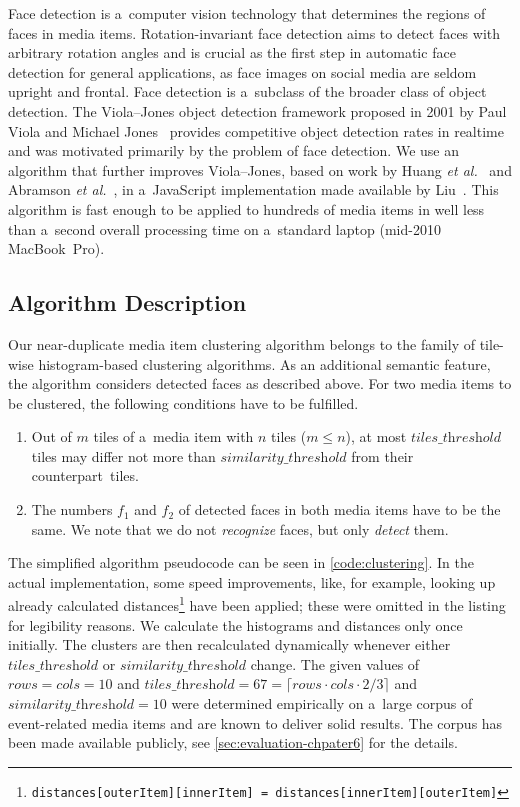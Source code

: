 Face detection is a~computer vision technology
that determines the regions of faces in media items.
Rotation-invariant face detection aims to detect faces with arbitrary
rotation angles and is crucial as the first step in automatic face detection
for general applications, as face images on social media are seldom upright and frontal.
Face detection is a~subclass of the broader class of object detection.
The Viola--Jones object detection framework proposed in 2001
by Paul Viola and Michael
Jones~\cite{viola2001objectdetection,viola2004robust}
provides competitive object detection rates in realtime
and was motivated primarily by the problem of face detection.
We use an algorithm that further improves Viola--Jones,
based on work by Huang \emph{et al.}~\cite{huang2007facedetection}
and Abramson \emph{et al.}~\cite{abramson2007yef},
in a~JavaScript implementation made available by Liu~\cite{liu2012facedetection}.
This algorithm is fast enough to be applied to hundreds of media items
in well less than a~second overall processing time on a~standard laptop
(mid-2010 MacBook~Pro).

\subsection{Algorithm Description}

Our near-duplicate media item clustering algorithm belongs to the family of
tile-wise histogram-based clustering algorithms.
As an additional semantic feature, the algorithm considers detected faces
as described above.
For two media items to be clustered,
the following conditions have to be fulfilled.

\begin{enumerate}
  \item Out of $m$ tiles of a~media item with $n$ tiles ($m \leq n$),
    at most $\textit{tiles\_threshold}$ tiles may differ not more than $\textit{similarity\_threshold}$
    from their counterpart~tiles.
  \item The numbers $f_1$ and $f_2$ of detected faces in both media items
    have to be the same.
    We note that we do not \emph{recognize} faces, but only \emph{detect} them.
\end{enumerate}

The simplified algorithm pseudocode can be seen in \autoref{code:clustering}.
In the actual implementation, some speed improvements,
like, for example, looking up already calculated
distances\footnote{\texttt{distances[outerItem][innerItem] =
distances[innerItem][outerItem]}}
have been applied;
these were omitted in the listing for legibility reasons.
We calculate the histograms and distances only once initially.
The clusters are then recalculated dynamically
whenever either $\textit{tiles\_threshold}$ or $\textit{similarity\_threshold}$ change.
The given values of $\textit{rows} = \textit{cols} = 10$ and
$\textit{tiles\_threshold} = 67 = \lceil \textit{rows} \cdot \textit{cols} \cdot 2/3 \rceil$
and $\textit{similarity\_threshold} = 10$ were determined empirically
on a~large corpus of event-related media items
and are known to deliver solid results.
The corpus has been made available publicly,
see \autoref{sec:evaluation-chpater6} for the details.

